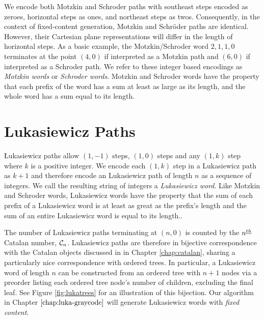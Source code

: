 We encode both Motzkin and Schroder paths with southeast steps encoded as zeroes, horizontal steps as ones, and northeast steps as twos.
Consequently, in the context of fixed-content generation, Motzkin and Schröder paths are identical.  However, their Cartesian plane representations will differ in the length of horizontal steps. As a basic example, the Motzkin/Schroder word $2,1,1,0$ terminates at the point $(4,0)$ if interpreted as a Motzkin path and $(6,0)$ if interpreted as a Schroder path.  We refer to these integer based encodings as \emph{Motzkin words} or \emph{Schroder words}.  Motzkin and Schroder words have the property that each prefix of the word has a sum at least as large as its length, and the whole word has a sum equal to its length.



\section{Lukasiewicz Paths}\label{sec:lukasiewicz}

Łukasiewicz paths allow $(1,-1)$ steps, $(1,0)$ steps and any $(1,k)$ step where $k$ is a positive integer. We encode each $(1,k)$ step in a Lukasiewicz path as $k+1$ and therefore encode an Lukasiewicz path of length $n$ as a sequence of integers.  We call the resulting string of integers a \emph{Lukasiewicz word}.  Like Motzkin and Schroder words, Lukasiewicz words have the property that the sum of each prefix of a Lukasiewicz word is at least as great as the prefix's length and the sum of an entire Lukasiewicz word is equal to its length.. 

The number of Lukasiewicz paths terminating at $(n,0)$ is counted by the $n^{\underline{th}}$ Catalan number, $\mathcal{C}_n$. Lukasiewicz paths are therefore in bijective correspondence with the Catalan objects discussed in in Chapter \ref{chap:catalan}, sharing a particularly nice correspondence with ordered trees. In particular, a Lukasiewicz word of length $n$ can be constructed from an ordered tree with $n+1$ nodes via a preorder listing each ordered tree node's number of children, excluding the final leaf.  See Figure \ref{fig:lukatrees} for an illustration of this bijection.
Our algorithm in Chapter $\ref{chap:luka-graycode}$ will generate Lukasiewicz words with \emph{fixed content}.


